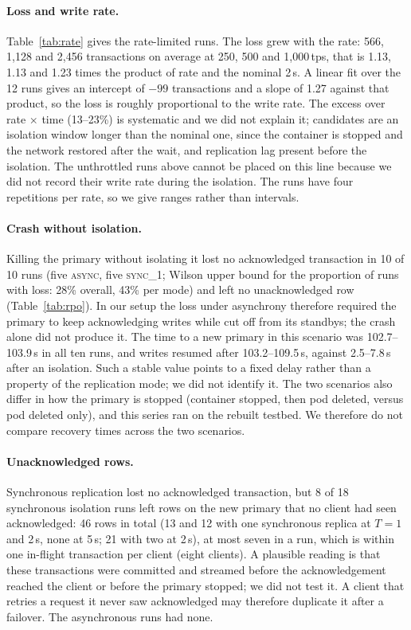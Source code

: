 \documentclass[smallextended]{svjour3}
\begin{document}
\paragraph{Loss and write rate.} Table~\ref{tab:rate} gives the rate-limited runs. The loss grew with the rate: 566, 1,128 and 2,456 transactions on average at 250, 500 and 1,000\,tps, that is 1.13, 1.13 and 1.23 times the product of rate and the nominal 2\,s. A linear fit over the 12 runs gives an intercept of $-99$ transactions and a slope of 1.27 against that product, so the loss is roughly proportional to the write rate. The excess over rate $\times$ time (13--23\%) is systematic and we did not explain it; candidates are an isolation window longer than the nominal one, since the container is stopped and the network restored after the wait, and replication lag present before the isolation. The unthrottled runs above cannot be placed on this line because we did not record their write rate during the isolation. The runs have four repetitions per rate, so we give ranges rather than intervals.

\paragraph{Crash without isolation.} Killing the primary without isolating it lost no acknowledged transaction in 10 of 10 runs (five \textsc{async}, five \textsc{sync\_1}; Wilson upper bound for the proportion of runs with loss: 28\% overall, 43\% per mode) and left no unacknowledged row (Table~\ref{tab:rpo}). In our setup the loss under asynchrony therefore required the primary to keep acknowledging writes while cut off from its standbys; the crash alone did not produce it. The time to a new primary in this scenario was 102.7--103.9\,s in all ten runs, and writes resumed after 103.2--109.5\,s, against 2.5--7.8\,s after an isolation. Such a stable value points to a fixed delay rather than a property of the replication mode; we did not identify it. The two scenarios also differ in how the primary is stopped (container stopped, then pod deleted, versus pod deleted only), and this series ran on the rebuilt testbed. We therefore do not compare recovery times across the two scenarios.

\paragraph{Unacknowledged rows.} Synchronous replication lost no acknowledged transaction, but 8 of 18 synchronous isolation runs left rows on the new primary that no client had seen acknowledged: 46 rows in total (13 and 12 with one synchronous replica at $T=1$ and 2\,s, none at 5\,s; 21 with two at 2\,s), at most seven in a run, which is within one in-flight transaction per client (eight clients). A plausible reading is that these transactions were committed and streamed before the acknowledgement reached the client or before the primary stopped; we did not test it. A client that retries a request it never saw acknowledged may therefore duplicate it after a failover. The asynchronous runs had none.
\end{document}
